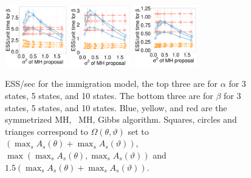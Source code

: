 \begin{figure}[H]
  \begin{minipage}[h!]{0.99\linewidth}
    \includegraphics [width=0.24\textwidth, angle=0]{figs/new_whole_exp_figs/q_beta_dim3.pdf}
	\hspace{.6in}
    \includegraphics [width=0.24\textwidth, angle=0]{figs/new_whole_exp_figs/q_beta_dim5.pdf}
	\hspace{.6in}
    \includegraphics [width=0.24\textwidth, angle=0]{figs/new_whole_exp_figs/q_beta_dim10.pdf}
  \end{minipage}
    \caption{ESS/sec for the immigration model, the top three are for $\alpha$ for 3 states, 5 states, and 10 states. The bottom three are for $\beta$ for 3 states, 5 states, and 10 states. Blue, yellow, and red are the symmetrized MH, \naive\ MH, Gibbs algorithm. Squares, circles and trianges correspond to $\Omega(\theta,\vartheta)$ set to $(\max_s A_s(\theta) + \max_s A_s(\vartheta))$, $\max(\max_s A_s(\theta), \max_s A_s(\vartheta))$ and  $1.5(\max_s A_s(\theta) + \max_s A_s(\vartheta))$.}
     \label{fig:ESS_Q}
  \end{figure}


